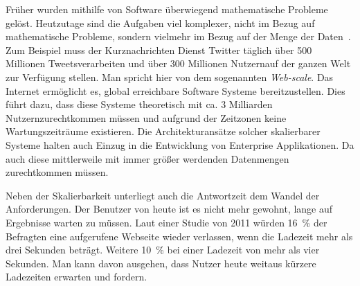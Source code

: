 Früher wurden mithilfe von Software überwiegend mathematische Probleme gelöst. Heutzutage sind die Aufgaben viel komplexer, nicht im Bezug auf mathematische Probleme, sondern vielmehr im Bezug auf der Menge der Daten~\cite[S.~18]{kuhn_reactive_2015}. Zum Beispiel muss der Kurznachrichten Dienst Twitter täglich über 500 Millionen Tweets\footnotemark[1] verarbeiten und über 300 Millionen Nutzern\footnotemark[2] auf der ganzen Welt zur Verfügung stellen. Man spricht hier von dem sogenannten \textit{Web-scale}. Das Internet ermöglicht es, global erreichbare Software Systeme bereitzustellen. Dies führt dazu, dass diese Systeme theoretisch mit ca. 3 Milliarden Nutzern\footnotemark[3] zurechtkommen müssen und aufgrund der Zeitzonen keine Wartungszeiträume existieren. Die Architekturansätze solcher skalierbarer Systeme halten auch Einzug in die Entwicklung von Enterprise Applikationen. Da auch diese mittlerweile mit immer größer werdenden Datenmengen zurechtkommen müssen.


\pagebreak

Neben der Skalierbarkeit unterliegt auch die Antwortzeit dem Wandel der Anforderungen. Der Benutzer von heute ist es nicht mehr gewohnt, lange auf Ergebnisse warten zu müssen. Laut einer Studie von 2011 würden 16~\% der Befragten eine aufgerufene Webseite wieder verlassen, wenn die Ladezeit mehr als drei Sekunden beträgt. Weitere 10~\% bei einer Ladezeit von mehr als vier Sekunden\footnotemark[4]. Man kann davon ausgehen, dass Nutzer heute weitaus kürzere Ladezeiten erwarten und fordern.\\


